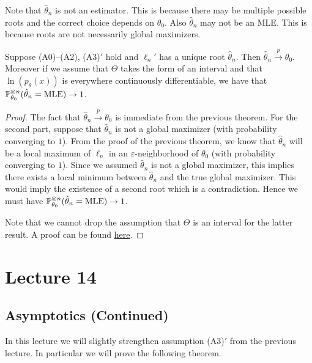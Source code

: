 \begin{remark}
Note that $\hat \theta_n$ is not an estimator. This is because there may be multiple possible roots and the correct choice depends on $\theta_0$. Also $\hat \theta_n$ may not be an MLE. 	This is because roots are not necessarily global maximizers.
\end{remark}

\begin{corollary}
	Suppose (A0)--(A2), (A3)$'$ hold and $\ell_n'$ has a unique root $\hat \theta_n$. Then $\hat \theta_n \overset{p}{\to} \theta_0$. Moreover if we assume that $\Theta$ takes the form of an interval and that $\ln(p_\theta(x))$ is everywhere continuously differentiable, we have that $\mathbb{P}^{\otimes n}_{\theta_0}(\hat \theta_n = \text{MLE}) \to 1$.
\end{corollary}

\begin{proof}
	The fact that $\hat \theta_n \overset{p}{\to} \theta_0$ is immediate from the previous theorem. For the second part, suppose that $\hat \theta_n$ is not a global maximizer (with probability converging to $1$). From the proof of the previous theorem, we know that $\hat \theta_n$ will be a local maximum of $\ell_n$ in an $\varepsilon$-neighborhood of $\theta_0$ (with probability converging to $1$). Since we assumed $\hat \theta_n$ is not a global maximizer, this implies there exists a local minimum between $\hat \theta_n$  and the true global maximizer. This would imply the existence of a second root which is a contradiction. Hence we must have $\mathbb{P}^{\otimes n}_{\theta_0}(\hat \theta_n = \text{MLE}) \to 1$. 
	
	\medskip \noindent Note that we cannot drop the assumption that $\Theta$ is an interval for the latter result. A proof can be found \href{https://danieletaat.github.io/posts/2025/11/inconsistent_mle/}{here}.
\end{proof}



\newpage
\section{Lecture 14}

\subsection{Asymptotics (Continued)}

In this lecture we will slightly strengthen assumption (A3)$'$ from the previous lecture. In particular we will prove the following theorem.

